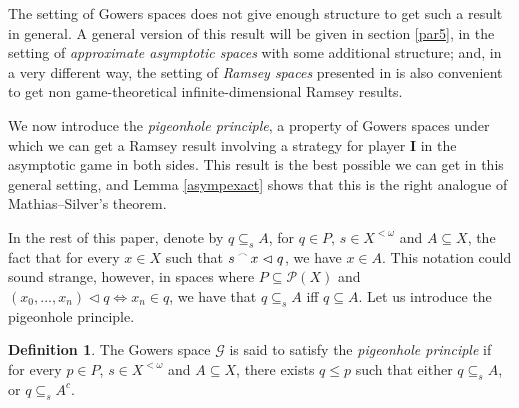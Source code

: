 \documentclass[a4paper,11pt]{article}
\theoremstyle{definition}
\newtheorem{defin}[thm]{Definition}
\numberwithin{equation}{section}
\newcommand{\G}{\mathcal{G}}
\newcommand{\I}{\textbf{I}}
\newcommand{\concat}{%
  \mathbin{\raisebox{1ex}{\scalebox{.7}{$\frown$}}}%
}
\begin{document}
The setting of Gowers spaces does not give enough structure to get such a result in general. A general version of this result will be given in section \ref{par5}, in the setting of \emph{approximate asymptotic spaces} with some additional structure; and, in a very different way, the setting of \emph{Ramsey spaces} presented in \cite{todorcevicorange} is also convenient to get non game-theoretical infinite-dimensional Ramsey results.

\smallskip

We now introduce the \emph{pigeonhole principle}, a property of Gowers spaces under which  we can get a Ramsey result involving a strategy for player \I{} in the asymptotic game in both sides. This result is the best possible we can get in this general setting, and Lemma \ref{asympexact} shows that this is the right analogue of Mathias--Silver's theorem.
 
\smallskip
 
In the rest of this paper, denote by $q \subseteq_s A$, for $q \in P$, $s \in X^{< \omega}$ and $A \subseteq X$, the fact that for every $x \in X$ such that $s \concat x \vartriangleleft q$, we have $x \in A$. This notation could sound strange, however, in spaces where $P \subseteq \mathcal{P}(X)$ and $(x_0, \ldots, x_n) \vartriangleleft q \Leftrightarrow x_n \in q$, we have that $q \subseteq_s A$ iff $q \subseteq A$. Let us introduce the pigeonhole principle.

\begin{defin}

The Gowers space $\G$ is said to satisfy the \emph{pigeonhole principle} if for every $p \in P$, $s \in X^{<\omega}$ and $A \subseteq X$, there exists $q \leqslant p$ such that either $q \subseteq_s A$, or $q \subseteq_s A^c$.

\end{defin}
\end{document}
